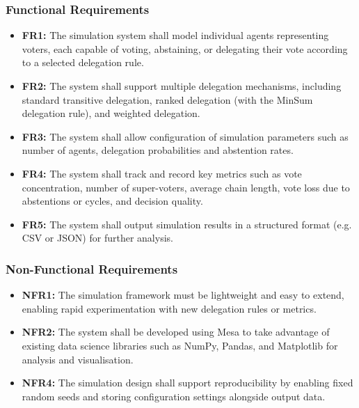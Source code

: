 \subsubsection{Functional Requirements}
\begin{itemize}
    \item \textbf{FR1:} The simulation system shall model individual agents representing voters, each capable of voting, abstaining, or delegating their vote according to a selected delegation rule.

    \item \textbf{FR2:} The system shall support multiple delegation mechanisms, including standard transitive delegation, ranked delegation (with the MinSum delegation rule), and weighted delegation.

    \item \textbf{FR3:} The system shall allow configuration of simulation parameters such as number of agents, delegation probabilities and abstention rates.

    \item \textbf{FR4:} The system shall track and record key metrics such as vote concentration, number of super-voters, average chain length, vote loss due to abstentions or cycles, and decision quality.

    \item \textbf{FR5:} The system shall output simulation results in a structured format (e.g. CSV or JSON) for further analysis.
\end{itemize}

\subsubsection{Non-Functional Requirements}
\begin{itemize}
    \item \textbf{NFR1:} The simulation framework must be lightweight and easy to extend, enabling rapid experimentation with new delegation rules or metrics.

    \item \textbf{NFR2:} The system shall be developed using Mesa to take advantage of existing data science libraries such as NumPy, Pandas, and Matplotlib for analysis and visualisation.

    \item \textbf{NFR4:} The simulation design shall support reproducibility by enabling fixed random seeds and storing configuration settings alongside output data.

\end{itemize}

